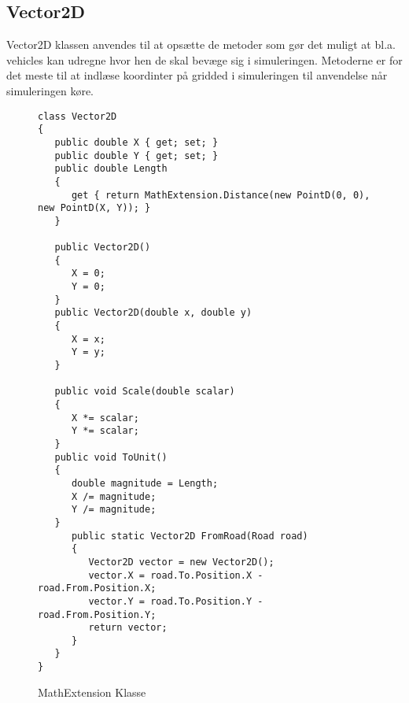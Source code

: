 \subsection{Vector2D}
Vector2D klassen anvendes til at opsætte de metoder som gør det muligt at bl.a. vehicles kan udregne hvor hen de skal bevæge sig i simuleringen. Metoderne er for det meste til at indlæse koordinter på gridded i simuleringen til anvendelse når simuleringen køre.
\begin{figure}[H]
\begin{lstlisting}
class Vector2D
{
   public double X { get; set; }
   public double Y { get; set; }
   public double Length
   {
      get { return MathExtension.Distance(new PointD(0, 0), new PointD(X, Y)); }
   }

   public Vector2D()
   {
      X = 0;
      Y = 0;
   }
   public Vector2D(double x, double y)
   {
      X = x;
      Y = y;
   }

   public void Scale(double scalar)
   {
      X *= scalar;
      Y *= scalar;
   }
   public void ToUnit()
   {
      double magnitude = Length;
      X /= magnitude;
      Y /= magnitude;
   }
      public static Vector2D FromRoad(Road road)
      {
         Vector2D vector = new Vector2D();
         vector.X = road.To.Position.X - road.From.Position.X;
         vector.Y = road.To.Position.Y - road.From.Position.Y;
         return vector;
      }
   }
}
\end{lstlisting}
\caption{MathExtension Klasse}\label{MathExtensionClass}
\end{figure}